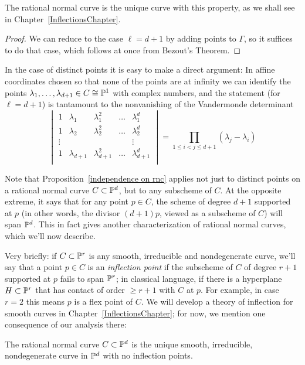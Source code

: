 The rational normal curve is the unique curve with this property, as we shall see in Chapter~\ref{InflectionsChapter}. 

\begin{proof}
We can reduce to the case $\ell = d+1$ by adding points to $\Gamma$, so it suffices to do that case, which follows at once from Bezout's Theorem.
\end{proof}

In the case of distinct points it is easy to make a direct argument: In affine coordinates chosen so that none of the points are
at infinity we can identify the points $\lambda_1,\dots,\lambda_{d+1} \in C \cong {\mathbb P}^1$ with complex numbers, and the statement (for $\ell = d+1$) is tantamount to the nonvanishing of the Vandermonde determinant
$$
\begin{vmatrix}
1 & \lambda_1 & \lambda_1^2 & \dots & \lambda_1^d \\
1 & \lambda_2 & \lambda_2^2 & \dots & \lambda_2^d \\
\vdots & & & & \vdots \\
1 & \lambda_{d+1} & \lambda_{d+1}^2 & \dots & \lambda_{d+1}^d \\
\end{vmatrix}
= \prod_{1 \leq i < j \leq d+1} (\lambda_j - \lambda_i)
$$

Note that Proposition~\ref{independence on rnc} applies not just to distinct points on a rational normal curve $C \subset {\mathbb P}^d$, but to any subscheme of $C$. At the opposite extreme, it says that for any point $p \in C$, the scheme of degree $d+1$ supported at $p$ (in other words, the divisor $(d+1)p$, viewed as a subscheme of $C$) will span ${\mathbb P}^d$. This in fact gives another characterization of rational normal curves, which we'll now describe.

Very briefly: if $C \subset {\mathbb P}^r$ is any smooth, irreducible and nondegenerate curve, we'll say that a point $p \in C$ is an \emph{inflection point} if the subscheme of $C$ of degree $r+1$ supported at $p$  fails to span ${\mathbb P}^r$; in classical language, if there is a hyperplane $H \subset {\mathbb P}^r$ that has contact of order $\geq r+1$ with $C$ at $p$. For example, in case $r=2$ this means $p$ is a flex point of $C$. We will develop a theory of inflection for smooth curves in Chapter~\ref{InflectionsChapter}; for now, we  mention one consequence of our analysis there:

\begin{proposition}\label{rnc unique uninflected}
The rational normal curve $C \subset {\mathbb P}^d$ is the unique smooth, irreducible, nondegenerate curve in ${\mathbb P}^d$ with no inflection points.
\end{proposition}

